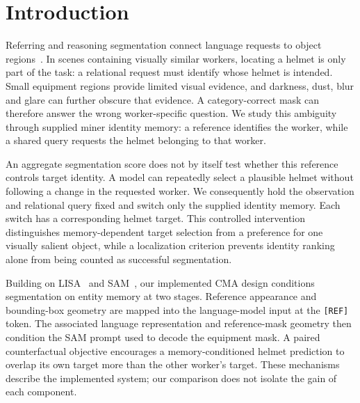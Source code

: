 \section{Introduction}
\label{sec:introduction}
Referring and reasoning segmentation connect language requests to object
regions~\cite{ye2019cross,lai2024lisa}. In scenes containing visually similar workers, locating a helmet is only part
of the task: a relational request must identify whose helmet is intended.
Small equipment regions provide limited visual evidence, and darkness, dust,
blur and glare can further obscure that evidence. A category-correct mask can
therefore answer the wrong worker-specific question. We study this ambiguity
through supplied miner identity memory: a reference identifies the worker,
while a shared query requests the helmet belonging to that worker.

An aggregate segmentation score does not by itself test whether this reference
controls target identity. A model can repeatedly select a plausible helmet
without following a change in the requested worker. We consequently hold the
observation and relational query fixed and switch only the supplied identity
memory. Each switch has a corresponding helmet target. This controlled
intervention distinguishes memory-dependent target selection from a preference
for one visually salient object, while a localization criterion prevents
identity ranking alone from being counted as successful segmentation.

Building on LISA~\cite{lai2024lisa} and SAM~\cite{kirillov2023segment},
our implemented CMA design conditions segmentation on entity memory at two
stages. Reference appearance and bounding-box geometry are mapped into the
language-model input at the \texttt{[REF]} token. The associated language
representation and reference-mask geometry then condition the SAM prompt used
to decode the equipment mask. A paired counterfactual objective encourages a
memory-conditioned helmet prediction to overlap its own target more than the
other worker's target. These mechanisms describe the implemented system; our
comparison does not isolate the gain of each component.

